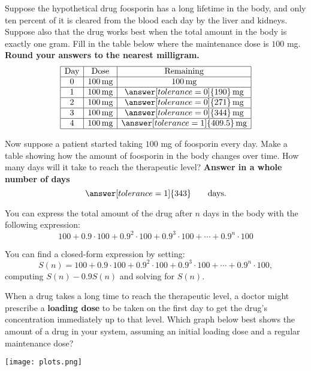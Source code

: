 \documentclass{ximera}
\begin{document}
\newpage
\begin{question}
  Suppose the hypothetical drug foosporin has a long lifetime in the
  body, and only ten percent of it is cleared from the blood each day
  by the liver and kidneys. Suppose also that the drug works best when
  the total amount in the body is exactly one gram. Fill in the table
  below where the maintenance dose is $100$ mg. \textbf{Round your answers to the
  nearest milligram.}
  \[
  \begin{array}{|c|c|c|}
    \hline
    \text{Day} & \text{Dose} & \text{Remaining} \\ \hline
    0  & 100\,\text{mg} & 100\,\text{mg} \\ \hline
    1  & 100\,\text{mg} & \answer[tolerance=0]{190}\,\text{mg}\\ \hline
    2  & 100\,\text{mg} & \answer[tolerance=0]{271}\,\text{mg}\\ \hline
    3  & 100\,\text{mg} & \answer[tolerance=0]{344}\,\text{mg}\\ \hline
    4  & 100\,\text{mg} & \answer[tolerance=1]{409.5}\,\text{mg}\\ \hline
  \end{array}
  \]
\end{question}

\begin{question}
Now suppose a patient started taking $100$ mg of foosporin every day.
Make a table showing how the amount of foosporin in the body changes
over time.  How many days will it take to reach the therapeutic level?
\textbf{Answer in a whole number of days}
\[
\answer[tolerance=1]{343}\qquad\text{days.}
\]
\begin{hint}
  You can express the total amount of the drug after $n$ days in the
  body with the following expression:
  \[
  100 + 0.9\cdot 100 + 0.9^2 \cdot 100 + 0.9^3 \cdot 100 +\cdots + 0.9^n \cdot 100
  \]
\end{hint}
\begin{hint}
  You can find a closed-form expression by setting:
  \[
  S(n)= 100 + 0.9\cdot 100 + 0.9^2 \cdot 100 + 0.9^3 \cdot 100 +\cdots + 0.9^n \cdot 100,
  \]
  computing $S(n) - 0.9 S(n)$ and solving for $S(n)$.
\end{hint}
\end{question}


\begin{question}
When a drug takes a long time to reach the therapeutic level, a doctor
might prescribe a \textbf{loading dose} to be taken on the first day
to get the drug's concentration immediately up to that level. Which
graph below best shows the amount of a drug in your system, assuming
an initial loading dose and a regular maintenance dose?
\begin{image}
  \texttt{[image: plots.png]}
\end{image}
\begin{multipleChoice}
\end{multipleChoice}
\end{question}
\end{document}
